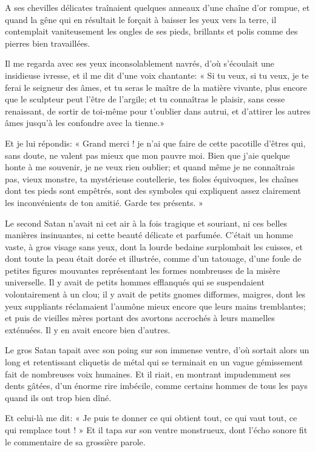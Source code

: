 A ses chevilles délicates traînaient quelques anneaux
d’une chaîne d’or rompue, et quand la
gêne qui en résultait le forçait à baisser les yeux vers la terre, il
contemplait vaniteusement les ongles de ses pieds, brillants et polis
comme des pierres bien travaillées.

Il me regarda avec ses yeux inconsolablement navrés,
d’où s’écoulait une insidieuse
ivresse, et il me dit d’une voix chantante: « Si tu
veux, si tu veux, je te ferai le seigneur des âmes, et tu seras le
maître de la matière vivante, plus encore que le sculpteur peut
l’être de l’argile; et tu connaîtras
le plaisir, sans cesse renaissant, de sortir de toi{}-même pour
t’oublier dans autrui, et d’attirer
les autres âmes jusqu’à les confondre avec la tienne.»

Et je lui répondis: « Grand merci ! je n’ai que faire
de cette pacotille d’êtres qui, sans doute, ne valent
pas mieux que mon pauvre moi. Bien que j’aie quelque
honte à me souvenir, je ne veux rien oublier; et quand même je ne
connaîtrais pas, vieux monstre, ta mystérieuse coutellerie, tes fioles
équivoques, les chaînes dont tes pieds sont empêtrés, sont des symboles
qui expliquent assez clairement les inconvénients de ton amitié. Garde
tes présents. »

Le second Satan n’avait ni cet air à la fois tragique
et souriant, ni ces belles manières insinuantes, ni cette beauté
délicate et parfumée. C’était un homme vaste, à gros
visage sans yeux, dont la lourde bedaine surplombait les cuisses, et
dont toute la peau était dorée et illustrée, comme
d’un tatouage, d’une foule de petites
figures mouvantes représentant les formes nombreuses de la misère
universelle. Il y avait de petits hommes efflanqués qui se suspendaient
volontairement à un clou; il y avait de petits gnomes difformes,
maigres, dont les yeux suppliants réclamaient l’aumône
mieux encore que leurs mains tremblantes; et puis de vieilles mères
portant des avortons accrochés à leurs mamelles exténuées. Il y en
avait encore bien d’autres.

Le gros Satan tapait avec son poing sur son immense ventre,
d’où sortait alors un long et retentissant cliquetis
de métal qui se terminait en un vague gémissement fait de nombreuses
voix humaines. Et il riait, en montrant impudemment ses dents gâtées,
d’un énorme rire imbécile, comme certains hommes de
tous les pays quand ils ont trop bien dîné.

Et celui{}-là me dit: « Je puis te donner ce qui obtient tout, ce qui
vaut tout, ce qui remplace tout ! » Et il tapa sur son ventre
monstrueux, dont l’écho sonore fit le commentaire de
sa grossière parole.

